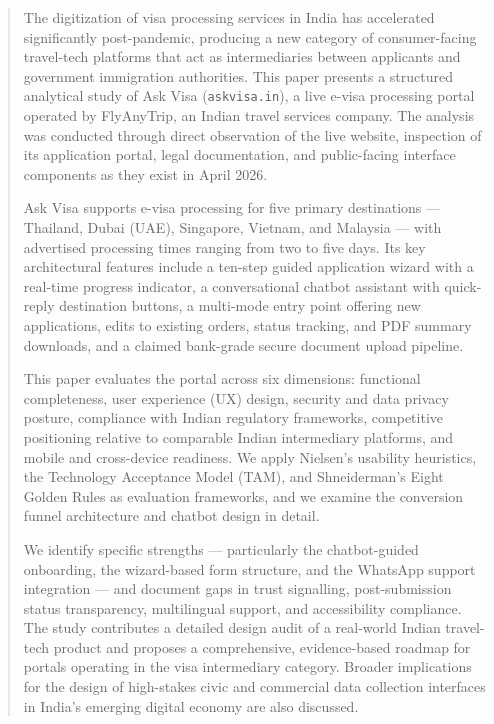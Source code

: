 \documentclass[journal, 10pt, twoside]{IEEEtran}
\begin{document}
\begin{abstract}
The digitization of visa processing services in India has accelerated
significantly post-pandemic, producing a new category of consumer-facing
travel-tech platforms that act as intermediaries between applicants and
government immigration authorities. This paper presents a structured
analytical study of Ask Visa (\texttt{askvisa.in}), a live e-visa
processing portal operated by FlyAnyTrip, an Indian travel services
company. The analysis was conducted through direct observation of the
live website, inspection of its application portal, legal documentation,
and public-facing interface components as they exist in April 2026.

Ask Visa supports e-visa processing for five primary destinations ---
Thailand, Dubai (UAE), Singapore, Vietnam, and Malaysia --- with
advertised processing times ranging from two to five days. Its key
architectural features include a ten-step guided application wizard with
a real-time progress indicator, a conversational chatbot assistant with
quick-reply destination buttons, a multi-mode entry point offering new
applications, edits to existing orders, status tracking, and PDF summary
downloads, and a claimed bank-grade secure document upload pipeline.

This paper evaluates the portal across six dimensions: functional
completeness, user experience (UX) design, security and data privacy
posture, compliance with Indian regulatory frameworks, competitive
positioning relative to comparable Indian intermediary platforms, and
mobile and cross-device readiness. We apply Nielsen's usability
heuristics, the Technology Acceptance Model (TAM), and Shneiderman's
Eight Golden Rules as evaluation frameworks, and we examine the
conversion funnel architecture and chatbot design in detail.

We identify specific strengths --- particularly the chatbot-guided
onboarding, the wizard-based form structure, and the WhatsApp support
integration --- and document gaps in trust signalling, post-submission
status transparency, multilingual support, and accessibility compliance.
The study contributes a detailed design audit of a real-world Indian
travel-tech product and proposes a comprehensive, evidence-based roadmap
for portals operating in the visa intermediary category. Broader
implications for the design of high-stakes civic and commercial data
collection interfaces in India's emerging digital economy are also
discussed.
\end{abstract}
\end{document}
